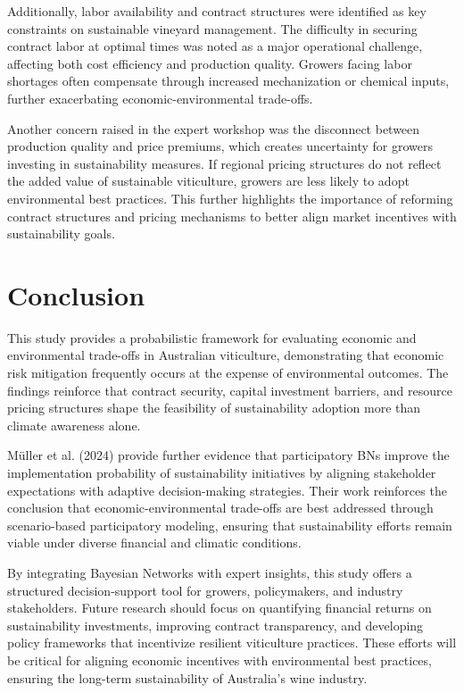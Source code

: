 \documentclass{article}
\begin{document}
Additionally, labor availability and contract structures were identified as key constraints on sustainable vineyard management. The difficulty in securing contract labor at optimal times was noted as a major operational challenge, affecting both cost efficiency and production quality. Growers facing labor shortages often compensate through increased mechanization or chemical inputs, further exacerbating economic-environmental trade-offs.

Another concern raised in the expert workshop was the disconnect between production quality and price premiums, which creates uncertainty for growers investing in sustainability measures. If regional pricing structures do not reflect the added value of sustainable viticulture, growers are less likely to adopt environmental best practices. This further highlights the importance of reforming contract structures and pricing mechanisms to better align market incentives with sustainability goals.


\section{Conclusion}
This study provides a probabilistic framework for evaluating economic and environmental trade-offs in Australian viticulture, demonstrating that economic risk mitigation frequently occurs at the expense of environmental outcomes. The findings reinforce that contract security, capital investment barriers, and resource pricing structures shape the feasibility of sustainability adoption more than climate awareness alone.

Müller et al. (2024) provide further evidence that participatory BNs improve the implementation probability of sustainability initiatives by aligning stakeholder expectations with adaptive decision-making strategies. Their work reinforces the conclusion that economic-environmental trade-offs are best addressed through scenario-based participatory modeling, ensuring that sustainability efforts remain viable under diverse financial and climatic conditions.

By integrating Bayesian Networks with expert insights, this study offers a structured decision-support tool for growers, policymakers, and industry stakeholders. Future research should focus on quantifying financial returns on sustainability investments, improving contract transparency, and developing policy frameworks that incentivize resilient viticulture practices. These efforts will be critical for aligning economic incentives with environmental best practices, ensuring the long-term sustainability of Australia’s wine industry.
\end{document}
